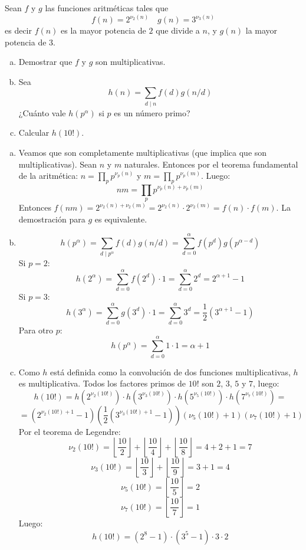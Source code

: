 \documentclass[twoside]{article}
\begin{document}
\begin{ejercicio}{2}
Sean $f$ y $g$ las funciones aritméticas tales que
\[ f(n) = 2^{ν_2(n)} \quad g(n) = 3^{ν_3(n)} \]
es decir $f(n)$ es la mayor potencia de $2$ que divide a $n$, y $g(n)$ la mayor potencia de $3$.
\begin{enumerate}[(a)]
\item Demostrar que $f$ y $g$ son multiplicativas.
\item Sea
\[ h(n) = \sum_{d \mid n} f(d) g(n/d) \]
¿Cuánto vale $h(p^α)$ si $p$ es un número primo?
\item Calcular $h(10!)$.
\end{enumerate}
\end{ejercicio}
\begin{solucion}
\begin{enumerate}[(a)]
\item Veamos que son completamente multiplicativas (que implica que son multiplicativas). Sean $n$ y $m$ naturales.
Entonces por el teorema fundamental de la aritmética: $n = \prod_p p^{ν_p(n)}$ y $m = \prod_p p^{ν_p(m)}$. Luego:
\[ nm = \prod_p p^{ν_p(n)+ν_p(m)}\]
Entonces $f(nm)=2^{ν_2(n)+ν_2(m)}=2^{ν_2(n)}\cdot 2^{ν_2(m)} = f(n)\cdot f(m)$. La demostración para $g$ es equivalente.
\item
\[ h(p^α) = \sum_{d \mid p^α} f(d) g(n/d) = \sum_{d=0}^{α} f(p^d) g(p^{α-d}) \]
Si $p=2$:
\[ h(2^α) = \sum_{d=0}^α f(2^d)\cdot 1 = \sum_{d=0}^α 2^d = 2^{α+1}-1 \]
Si $p=3$:
\[ h(3^α) = \sum_{d=0}^α g(3^d)\cdot 1 = \sum_{d=0}^α 3^d = \frac{1}{2}(3^{α+1}-1)\]
Para otro $p$:
\[ h(p^α) = \sum_{d=0}^α 1\cdot 1 = α+1\]

\item Como $h$ está definida como la convolución de dos funciones multiplicativas, $h$ es multiplicativa.
Todos los factores primos de $10!$ son $2$, $3$, $5$ y $7$, luego:
\[ h(10!) = h(2^{ν_2(10!)})\cdot h(3^{ν_3(10!)}) \cdot h(5^{ν_5(10!)}) \cdot h(7^{ν_7(10!)}) = \]
\[ = (2^{ν_2(10!)+1}-1)\left(\frac{1}{2}\left(3^{ν_3(10!)+1}-1\right)\right)(ν_5(10!)+1)(ν_7(10!)+1) \]
Por el teorema de Legendre:
\[ ν_2(10!) = \left\lfloor \frac{10}{2}\right\rfloor + \left\lfloor \frac{10}{4}\right\rfloor + \left\lfloor \frac{10}{8}\right\rfloor = 4+2+1=7 \]
\[ ν_3(10!) = \left\lfloor \frac{10}{3}\right\rfloor + \left\lfloor \frac{10}{9}\right\rfloor = 3+1 = 4 \]
\[ ν_5(10!) = \left\lfloor \frac{10}{5}\right\rfloor = 2 \]
\[ ν_7(10!) = \left\lfloor \frac{10}{7}\right\rfloor = 1 \]
Luego:
\[ h(10!) = (2^8-1)\cdot (3^5-1)\cdot 3 \cdot 2 \]
\end{enumerate}
\end{solucion}
\end{document}
